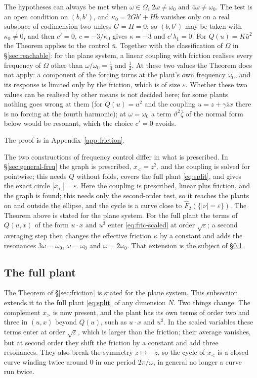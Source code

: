 \documentclass[11pt,reqno]{amsart}
\theoremstyle{plain}
\theoremstyle{definition}
\theoremstyle{remark}
\begin{document}
The hypotheses can always be met when $\omega\in\Omega$, $2\omega\ne\omega_0$ and $4\omega\ne\omega_0$. The test is an open
condition on $(b,b')$, and $\kappa_0=2Gb'+H\bar b$ vanishes only on a real subspace of codimension two unless $G=H=0$;
so $(b,b')$ may be taken with $\kappa_0\ne0$, and then $c'=0$, $c=-3/\kappa_0$ gives $\kappa=-3$ and $c'\lambda_1=0$. For
$Q(u)=K\bar u^{2}$ the Theorem applies to the control $\bar u$. Together with the classification of $\Omega$ in
\S\ref{sec:reachable}: for the plane system, a linear coupling with friction realises
every frequency of $\Omega$ other than $\omega/\omega_0=\frac14$ and $\frac12$. At these two values the Theorem does not
apply: a component of the forcing turns at the plant's own frequency $\omega_0$, and its response is limited only
by the friction, which is of size $\varepsilon$. Whether these two values can be realised by other means is not
decided here; for some plants nothing goes wrong at them (for $Q(u)=u^{2}$ and the coupling $u=z+\gamma\bar z x$
there is no forcing at the fourth harmonic); at $\omega=\omega_0$ a term $\vartheta^{2}\bar\zeta$ of the normal form below would be resonant, which the choice $c'=0$
avoids.

The proof is in Appendix~\ref{app:friction}.

The two constructions of frequency control differ in what is prescribed. In \S\ref{sec:general-freq} the
graph is prescribed, $x_<=z^{2}$, and the coupling is solved for pointwise; this needs $Q$ without folds,
covers the full plant \eqref{eq:split}, and gives the exact circle $|x_<|=\varepsilon$. Here the coupling is prescribed,
linear plus friction, and the graph is found; this needs only the second-order test, so it reaches the plants
on and outside the ellipse, and the cycle is a curve close to $\hat F_2(\{|\nu|=\varepsilon\})$. The Theorem above is
stated for the plane system. For the full plant the terms of $Q(u,x)$ of the form $u\cdot x$ and $u^{3}$ enter
\eqref{eq:fric-scaled} at order $\sqrt\varepsilon$; a second averaging step then changes the effective friction $\kappa$ by a
constant and adds the resonances $3\omega=\omega_0$, $\omega=\omega_0$ and $\omega=2\omega_0$. That extension is the subject of \S\ref{sec:friction-full}.


\subsection{The full plant}\label{sec:friction-full}
The Theorem of \S\ref{sec:friction} is stated for the plane system. This subsection extends it to the full
plant \eqref{eq:split} of any dimension $N$. Two things change. The complement $x_>$ is now present, and the plant
has its own terms of order two and three in $(u,x)$ beyond $Q(u)$, such as $u\cdot x$ and $u^{3}$. In the scaled
variables these terms enter at order $\sqrt\varepsilon$, which is larger than the friction; their average vanishes,
but at second order they shift the friction by a constant and add three resonances. They also break the symmetry
$z\mapsto-z$, so the cycle of $x_<$ is a closed curve winding twice around $0$ in one period $2\pi/\omega$, in general no longer a
curve run twice.
\end{document}
